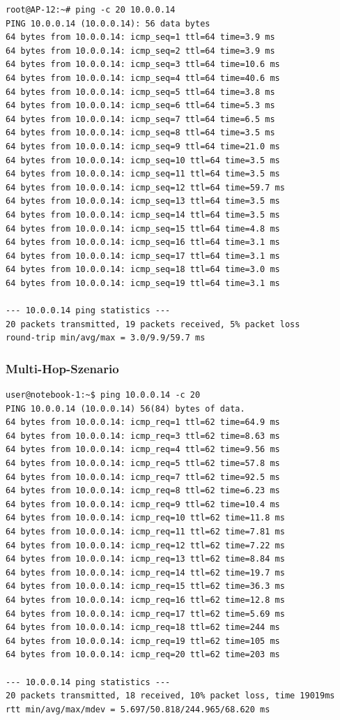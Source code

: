 \documentclass[a4paper,10pt]{article}
\begin{document}
\begin{lstlisting}
root@AP-12:~# ping -c 20 10.0.0.14
PING 10.0.0.14 (10.0.0.14): 56 data bytes
64 bytes from 10.0.0.14: icmp_seq=1 ttl=64 time=3.9 ms
64 bytes from 10.0.0.14: icmp_seq=2 ttl=64 time=3.9 ms
64 bytes from 10.0.0.14: icmp_seq=3 ttl=64 time=10.6 ms
64 bytes from 10.0.0.14: icmp_seq=4 ttl=64 time=40.6 ms
64 bytes from 10.0.0.14: icmp_seq=5 ttl=64 time=3.8 ms
64 bytes from 10.0.0.14: icmp_seq=6 ttl=64 time=5.3 ms
64 bytes from 10.0.0.14: icmp_seq=7 ttl=64 time=6.5 ms
64 bytes from 10.0.0.14: icmp_seq=8 ttl=64 time=3.5 ms
64 bytes from 10.0.0.14: icmp_seq=9 ttl=64 time=21.0 ms
64 bytes from 10.0.0.14: icmp_seq=10 ttl=64 time=3.5 ms
64 bytes from 10.0.0.14: icmp_seq=11 ttl=64 time=3.5 ms
64 bytes from 10.0.0.14: icmp_seq=12 ttl=64 time=59.7 ms
64 bytes from 10.0.0.14: icmp_seq=13 ttl=64 time=3.5 ms
64 bytes from 10.0.0.14: icmp_seq=14 ttl=64 time=3.5 ms
64 bytes from 10.0.0.14: icmp_seq=15 ttl=64 time=4.8 ms
64 bytes from 10.0.0.14: icmp_seq=16 ttl=64 time=3.1 ms
64 bytes from 10.0.0.14: icmp_seq=17 ttl=64 time=3.1 ms
64 bytes from 10.0.0.14: icmp_seq=18 ttl=64 time=3.0 ms
64 bytes from 10.0.0.14: icmp_seq=19 ttl=64 time=3.1 ms

--- 10.0.0.14 ping statistics --- 
20 packets transmitted, 19 packets received, 5% packet loss
round-trip min/avg/max = 3.0/9.9/59.7 ms
\end{lstlisting}

\subsubsection*{Multi-Hop-Szenario}

\begin{lstlisting}
user@notebook-1:~$ ping 10.0.0.14 -c 20
PING 10.0.0.14 (10.0.0.14) 56(84) bytes of data.
64 bytes from 10.0.0.14: icmp_req=1 ttl=62 time=64.9 ms
64 bytes from 10.0.0.14: icmp_req=3 ttl=62 time=8.63 ms
64 bytes from 10.0.0.14: icmp_req=4 ttl=62 time=9.56 ms
64 bytes from 10.0.0.14: icmp_req=5 ttl=62 time=57.8 ms
64 bytes from 10.0.0.14: icmp_req=7 ttl=62 time=92.5 ms
64 bytes from 10.0.0.14: icmp_req=8 ttl=62 time=6.23 ms
64 bytes from 10.0.0.14: icmp_req=9 ttl=62 time=10.4 ms
64 bytes from 10.0.0.14: icmp_req=10 ttl=62 time=11.8 ms
64 bytes from 10.0.0.14: icmp_req=11 ttl=62 time=7.81 ms
64 bytes from 10.0.0.14: icmp_req=12 ttl=62 time=7.22 ms
64 bytes from 10.0.0.14: icmp_req=13 ttl=62 time=8.84 ms
64 bytes from 10.0.0.14: icmp_req=14 ttl=62 time=19.7 ms
64 bytes from 10.0.0.14: icmp_req=15 ttl=62 time=36.3 ms
64 bytes from 10.0.0.14: icmp_req=16 ttl=62 time=12.8 ms
64 bytes from 10.0.0.14: icmp_req=17 ttl=62 time=5.69 ms
64 bytes from 10.0.0.14: icmp_req=18 ttl=62 time=244 ms
64 bytes from 10.0.0.14: icmp_req=19 ttl=62 time=105 ms
64 bytes from 10.0.0.14: icmp_req=20 ttl=62 time=203 ms

--- 10.0.0.14 ping statistics --- 
20 packets transmitted, 18 received, 10% packet loss, time 19019ms
rtt min/avg/max/mdev = 5.697/50.818/244.965/68.620 ms
\end{lstlisting}
\end{document}
